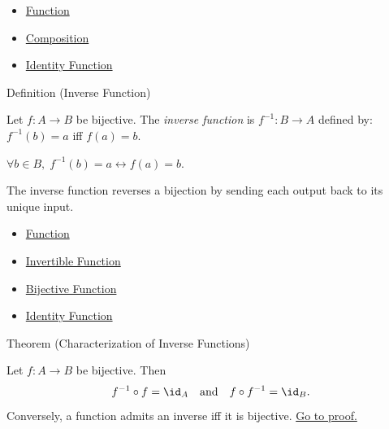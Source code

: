 \begin{dependencies}
\begin{itemize}
  \item \hyperref[def:function]{Function}
  \item \hyperref[def:composition]{Composition}
  \item \hyperref[def:identity]{Identity Function}
\end{itemize}
\end{dependencies}

\begin{definitionbox}{Definition (Inverse Function)}
\begin{definition}\label{def:inverse}
Let $f : A \to B$ be bijective. The \emph{inverse function} is
$f^{-1} : B \to A$ defined by: $f^{-1}(b) = a$ iff $f(a) = b$.
\end{definition}
\end{definitionbox}

\begin{remark*}
$\forall b\in B,\; f^{-1}(b)=a \leftrightarrow f(a)=b$.
\end{remark*}

\begin{remark*}[Interpretation]
The inverse function reverses a bijection by sending each output back to its
unique input.
\end{remark*}

\begin{dependencies}
\begin{itemize}
  \item \hyperref[def:function]{Function}
  \item \hyperref[def:invertible-function]{Invertible Function}
  \item \hyperref[def:bijective]{Bijective Function}
  \item \hyperref[def:identity]{Identity Function}
\end{itemize}
\end{dependencies}

\begin{theorembox}{Theorem (Characterization of Inverse Functions)}
\begin{theorem}\label{thm:inverse-char}
Let $f : A \to B$ be bijective. Then
\[
f^{-1} \circ f = \id_A
\quad\text{and}\quad
f \circ f^{-1} = \id_B.
\]
Conversely, a function admits an inverse iff it is bijective.
\hyperref[prf:inverse-char]{Go to proof.}
\end{theorem}
\end{theorembox}

